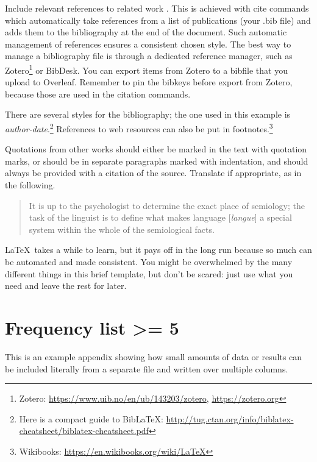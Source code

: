 \documentclass[a4paper,12pt]{article}
\begin{document}
Include relevant references to related work \parencite{Kopka04,Mittelbach04,Van_Dongen12}.
This is achieved with cite commands which automatically take references from a list of publications (your .bib file) and adds them to the bibliography at the end of the document.
Such automatic management of references ensures a consistent chosen style.
The best way to manage a bibliography file is through a dedicated reference manager, such as Zotero\footnote{Zotero: \url{https://www.uib.no/en/ub/143203/zotero}, \url{https://zotero.org}} or BibDesk.
You can export items from Zotero to a bibfile that you upload to Overleaf.
Remember to pin the bibkeys before export from Zotero, because those are used in the citation commands.

There are several styles for the bibliography; the one used in this example is \emph{author-date}.\footnote{Here is a compact guide to BibLaTeX: \url{http://tug.ctan.org/info/biblatex-cheatsheet/biblatex-cheatsheet.pdf}} 
References to web resources can also be put in footnotes.\footnote{Wikibooks: \url{https://en.wikibooks.org/wiki/LaTeX}} 

Quotations from other works should either be marked in the text with quotation marks, or should be in separate paragraphs marked with indentation, and should always be provided with a citation of the source.
Translate if appropriate, as in the following.

\begin{quote}
    It is up to the psychologist to determine the exact place of semiology; the task of the linguist is to define what makes language [\textit{langue}] a special system within the whole of the semiological facts. \parencite[p. 33; my translation]{Saussure16}
\end{quote}

\LaTeX\ takes a while to learn, but it pays off in the long run because so much can be automated and made consistent.
You might be overwhelmed by the many different things in this brief template, but don't be scared: just use what you need and leave the rest for later.

\printbibliography

\clearpage
\appendix
\section{Frequency list >= 5} \label{app:freq}
This is an example appendix showing how small amounts of data or results  can be included literally from a separate file and written over multiple columns.

\begin{multicols}{3}
{\footnotesize}
\end{multicols}
\end{document}
